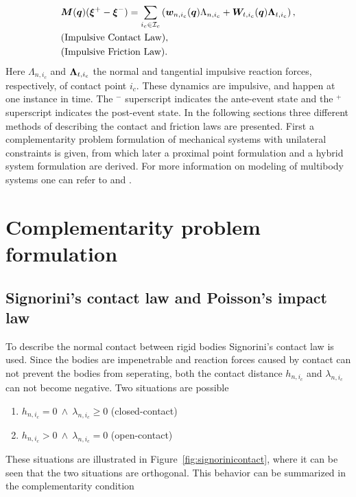 \documentclass[../DC2017114Bouma.tex]{subfiles}
\begin{document}
\begin{align}
&{\boldsymbol{M}}({\boldsymbol{q}})(\boldsymbol{\xi}^+ - \boldsymbol{\xi}^-) = \sum_{i_c\in\mathcal{I}_c}\left( {\boldsymbol{w}}_{n,i_c}({\boldsymbol{q}})\Lambda_{n,i_c} + {\boldsymbol{W}}_{t,i_c}({\boldsymbol{q}})\boldsymbol{\Lambda}_{t,i_c}\right), \label{eq:appimp1}\\
&\text{(Impulsive Contact Law)},\label{eq:appimp2}\\
&\text{(Impulsive Friction Law)}.\label{eq:appimp3}
\end{align}
Here $\Lambda_{n,i_c}$ and $\boldsymbol{\Lambda}_{t,i_c}$ the normal and tangential impulsive reaction forces, respectively, of contact point $i_c$. These dynamics are impulsive, and happen at one instance in time. The $^-$ superscript indicates the ante-event state and the $^+$ superscript indicates the post-event state. In the following sections three different methods of describing the contact and friction laws are presented. First a complementarity problem formulation of mechanical systems with unilateral constraints is given, from which later a proximal point formulation and a hybrid system formulation are derived. For more information on modeling of multibody systems one can refer to \cite{Leine2008} and \cite{Wouw2016}.

\section{Complementarity problem formulation}\label{sec:comp}
\subsection{Signorini's contact law and Poisson's impact law}
To describe the normal contact between rigid bodies Signorini's contact law is used. Since the bodies are impenetrable and reaction forces caused by contact can not prevent the bodies from seperating, both the contact distance $h_{n,i_c}$ and $\lambda_{n,i_c}$ can not become negative. Two situations are possible

\begin{enumerate}
\item $h_{n,i_c}=0\ \wedge\ \lambda_{n,i_c} \geq 0$ (closed-contact)
\item $h_{n,i_c}>0\ \wedge\ \lambda_{n,i_c} = 0$ (open-contact)
\end{enumerate}

These situations are illustrated in Figure~\ref{fig:signorinicontact}, where it can be seen that the two situations are orthogonal. This behavior can be summarized in the complementarity condition
\end{document}
